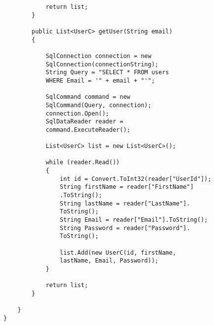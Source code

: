 \begin{lstlisting}
            return list;
        }

        public List<UserC> getUser(String email)
        {

            SqlConnection connection = new 
            SqlConnection(connectionString);
            String Query = "SELECT * FROM users
            WHERE Email = '" + email + "'";

            SqlCommand command = new 
            SqlCommand(Query, connection);
            connection.Open();
            SqlDataReader reader = 
            command.ExecuteReader();

            List<UserC> list = new List<UserC>();

            while (reader.Read())
            {
                int id = Convert.ToInt32(reader["UserId"]);
                String firstName = reader["FirstName"]
                .ToString();
                String lastName = reader["LastName"].
                ToString();
                String Email = reader["Email"].ToString();
                String Password = reader["Password"].
                ToString();

                list.Add(new UserC(id, firstName,
                lastName, Email, Password));
            }

            return list;
        }

    }
}

\end{lstlisting}

